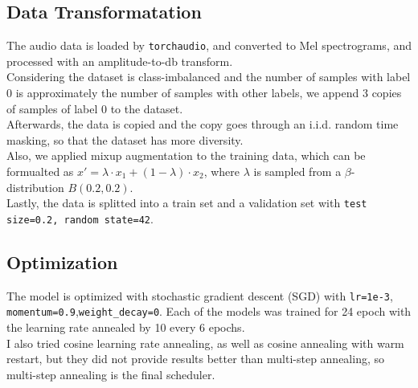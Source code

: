 \documentclass{article}
\begin{document}
    \subsection*{Data Transformatation}
    The audio data is loaded by \texttt{torchaudio}, and converted to Mel spectrograms, and processed with an amplitude-to-db transform. \\
    Considering the dataset is class-imbalanced and the number of samples with label 0 is approximately the number of samples with other labels, we append 3 copies of samples of label 0 to the dataset.\\
    Afterwards, the data is copied and the copy goes through an i.i.d. random time masking, so that the dataset has more diversity.\\
    Also, we applied mixup augmentation to the training data, which can be formualted as $x'=\lambda\cdot x_1+(1-\lambda)\cdot x_2$, where $\lambda$ is sampled from a $\beta$-distribution $B(0.2,0.2)$.\\
    Lastly, the data is splitted into a train set and a validation set with \texttt{test size=0.2, random state=42}.

    \subsection*{Optimization}
    The model is optimized with stochastic gradient descent (SGD) with \texttt{lr=1e-3}, \texttt{momentum=0.9},\texttt{weight\_decay=0}. Each of the models was trained for 24 epoch with the learning rate annealed by 10 every 6 epochs.\\
    I also tried cosine learning rate annealing, as well as cosine annealing with warm restart, but they did not provide results better than multi-step annealing, so multi-step annealing is the final scheduler.
\end{document}
